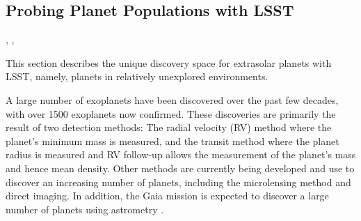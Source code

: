 %
%

\subsection{Probing Planet Populations with LSST}
\def\secname{planets}\label{sec:\secname}

,
,

This section describes the unique discovery space for
extrasolar planets with LSST, namely,
planets in relatively unexplored environments.


A large number of exoplanets have been discovered over the past few
decades, with over 1500 exoplanets now confirmed. These discoveries are
primarily the result of two detection methods: The radial velocity (RV)
method where the planet's minimum mass is measured, and the transit
method where the planet radius is measured and RV follow-up allows the
measurement of the planet's mass and hence mean density. Other methods
are currently being developed and use to discover an increasing number of
planets, including the microlensing method and direct imaging. In
addition, the Gaia mission is expected to discover a large number of
planets using astrometry \citep{2014exha.book.....P}.

